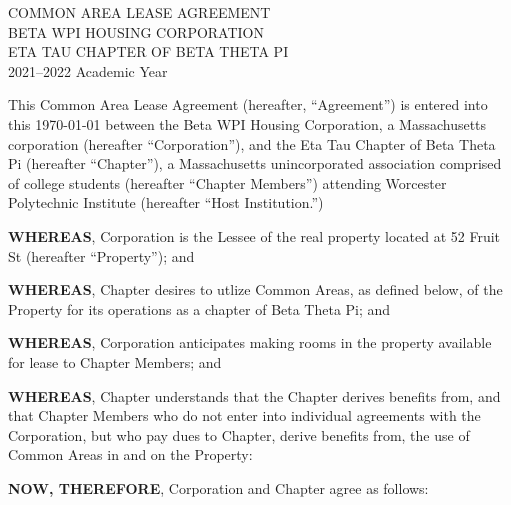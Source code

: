 \documentclass[12pt]{article}
\begin{document}
\begin{center}
        COMMON AREA LEASE AGREEMENT\\
        BETA WPI HOUSING CORPORATION\\
        ETA TAU CHAPTER OF BETA THETA PI\\
        2021--2022 Academic Year
\end{center}

This Common Area Lease Agreement (hereafter, “Agreement”) is entered into this \today{} between the Beta WPI Housing Corporation, a Massachusetts corporation (hereafter ``Corporation''), and the Eta Tau Chapter of Beta Theta Pi (hereafter ``Chapter''), a Massachusetts unincorporated association comprised of college students (hereafter ``Chapter Members'') attending Worcester Polytechnic Institute (hereafter ``Host Institution.'')

\textbf{WHEREAS}, Corporation is the Lessee of the real property located at 52 Fruit St (hereafter ``Property''); and

\textbf{WHEREAS}, Chapter desires to utlize Common Areas, as defined below, of the Property for its operations as a chapter of Beta Theta Pi; and

\textbf{WHEREAS}, Corporation anticipates making rooms in the property available for lease to Chapter Members; and

\textbf{WHEREAS}, Chapter understands that the Chapter derives benefits from, and that Chapter Members who do not enter into individual agreements with the Corporation, but who pay dues to Chapter, derive benefits from, the use of Common Areas in and on the Property:

\textbf{NOW, THEREFORE}, Corporation and Chapter agree as follows:
\end{document}
